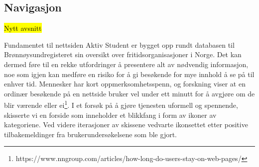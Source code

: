 \newpage
\subsection{Navigasjon}

\hl{Nytt avsnitt}

Fundamentet til nettsiden Aktiv Student er bygget opp rundt databasen til Brønnøysundregisteret sin oversikt over fritidsorganisasjoner i Norge. Det kan dermed føre til en rekke utfordringer å presentere alt av nødvendig informasjon, noe som igjen kan medføre en risiko for å gi besøkende for mye innhold å se på til enhver tid.
\vspace{5mm}
Mennesker har kort oppmerksomhetsspenn, og forskning viser at en ordinær besøkende på en nettside bruker vel under ett minutt for å avgjøre om de blir værende eller ei\footnote{https://www.nngroup.com/articles/how-long-do-users-stay-on-web-pages/}. I et forsøk på å gjøre tjenesten uformell og spennende, skisserte vi en forside som inneholder et blikkfang i form av ikoner av kategoriene. Ved videre iterasjoner av skissene vedvarte ikonsettet etter positive tilbakemeldinger fra brukerundersøkelsene som ble gjort.

